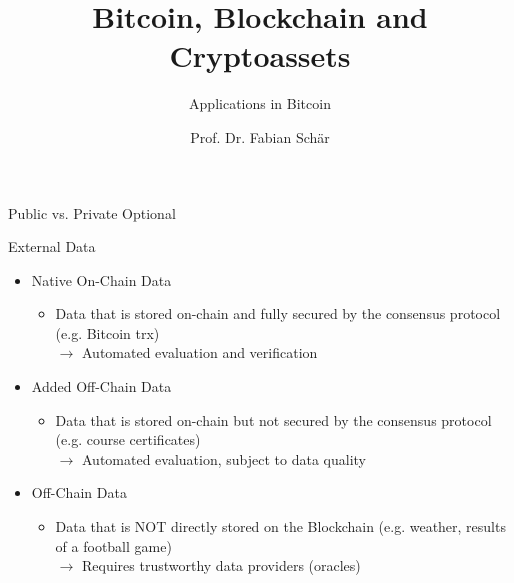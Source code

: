 \documentclass[]{beamer}
\title{Bitcoin, Blockchain and Cryptoassets}
\subtitle{Applications in Bitcoin}
\author{Prof. Dr. Fabian Schär}
\institute{University of Basel}
\begin{document}
\thispagestyle{empty}
\begin{frame}[noframenumbering]
	\titlepage
\end{frame}




\begin{frame}{Public vs. Private}
	Optional
\end{frame}


\begin{frame}{External Data}	
	\begin{itemize}
		\item<1 ->Native On-Chain Data
		\begin{itemize}
			\item<1 ->Data that is stored on-chain and fully secured by the consensus protocol (e.g. Bitcoin trx)\\
			\vspace{0.25em}$\rightarrow$ Automated evaluation and verification
		\end{itemize}
		\vspace{1em}
		\item<2 ->Added Off-Chain Data
		\begin{itemize}
			\item<2 -> Data that is stored on-chain but not secured by the consensus protocol (e.g. course certificates)\\
			\vspace{0.25em}$\rightarrow$ Automated evaluation, subject to data quality
		\end{itemize}
		\vspace{1em}
		\item<3 -> Off-Chain Data
		\begin{itemize}
			\item<3 -> Data that is NOT directly stored on the Blockchain (e.g. weather, results of a football game)\\
			\vspace{0.25em}$\rightarrow$ Requires trustworthy data providers (oracles)
		\end{itemize}
	\end{itemize}
\end{frame}

\end{document}
